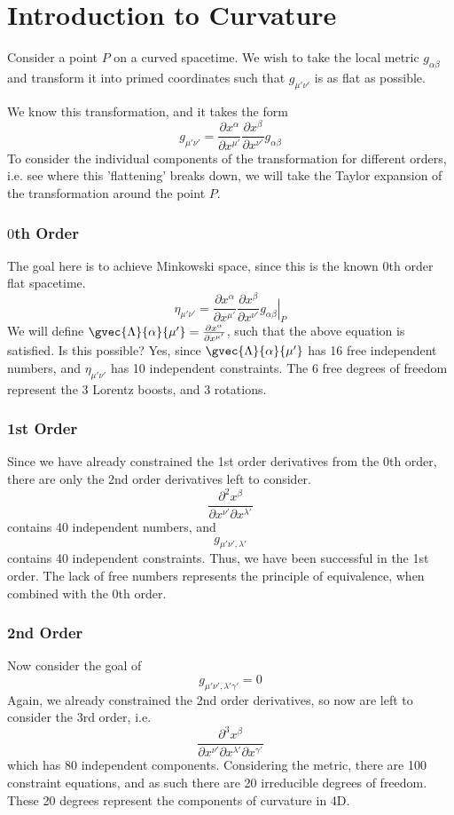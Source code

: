 \section{Introduction to Curvature}
Consider a point $P$ on a curved spacetime. We wish to take the local metric $g_{\alpha\beta}$ and transform it into primed coordinates such that $g_{\mu'\nu'}$ is as flat as possible. \par We know this transformation, and it takes the form
$$ g_{\mu'\nu'} = \frac{\partial x^\alpha}{\partial x^{\mu'}} \frac{\partial x^\beta}{\partial x^{\nu'}} g_{\alpha \beta} $$
To consider the individual components of the transformation for different orders, i.e. see where this 'flattening' breaks down, we will take the Taylor expansion of the transformation around the point $P$.
\subsubsection{$0$th Order}
The goal here is to achieve Minkowski space, since this is the known $0$th order flat spacetime.
$$ \eta_{\mu' \nu'} = \frac{\partial x^\alpha}{\partial x^{\mu'}} \frac{\partial x^\beta}{\partial x^{\nu'}} \left. g_{\alpha \beta} \right|_P$$
We will define $\gvec{\Lambda}{\alpha}{\mu'} = \frac{\partial x^\alpha}{\partial x^{\mu'}}$, such that the above equation is satisfied. Is this possible? Yes, since $\gvec{\Lambda}{\alpha}{\mu'}$ has 16 free independent numbers, and $\eta_{\mu' \nu'}$ has 10 independent constraints. The 6 free degrees of freedom represent the 3 Lorentz boosts, and 3 rotations.

\subsubsection{1st Order}
Since we have already constrained the 1st order derivatives from the 0th order, there are only the 2nd order derivatives left to consider. 
$$ \frac{\partial^2 x^\beta}{\partial x^{\nu'} \partial x^{\lambda'}} $$
contains 40 independent numbers, and 
$$ g_{\mu' \nu', \lambda'} $$
contains 40 independent constraints. Thus, we have been successful in the 1st order. The lack of free numbers represents the principle of equivalence, when combined with the 0th order.

\subsubsection{2nd Order}
Now consider the goal of
$$ g_{\mu' \nu', \lambda' \gamma'} = 0 $$
Again, we already constrained the 2nd order derivatives, so now are left to consider the 3rd order, i.e. 
$$ \frac{\partial^3 x^\beta}{\partial x^{\nu'} \partial x^{\lambda'} \partial x^{\gamma'}} $$
which has 80 independent components.
Considering the metric, there are 100 constraint equations, and as such there are 20 irreducible degrees of freedom. These 20 degrees represent the components of curvature in 4D.

